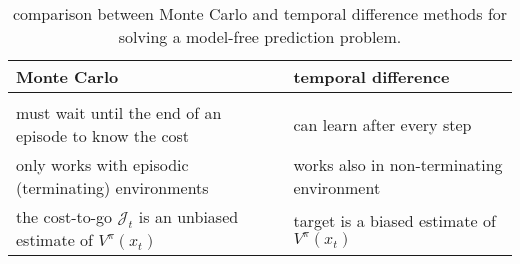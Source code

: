 \begin{table}[bt]
	\centering 
	\caption{comparison between Monte Carlo and temporal difference methods for solving a model-free prediction problem.} \label{tab:MCTDcomparison}
	\begin{tabular}{M{7cm} M{7cm}}
		\textbf{Monte Carlo} & \textbf{temporal difference} \\ \hline \hline \\ [-1.8ex]
		must wait until the end of an episode to know the cost & can learn after every step \\
		only works with episodic (terminating) environments & works also in non-terminating environment \\ 
		the cost-to-go $\mathcal J_t$ is an unbiased estimate of $V^\pi(x_t)$ & target is a biased estimate of $V^\pi(x_t)$ 
	\end{tabular}
\end{table}